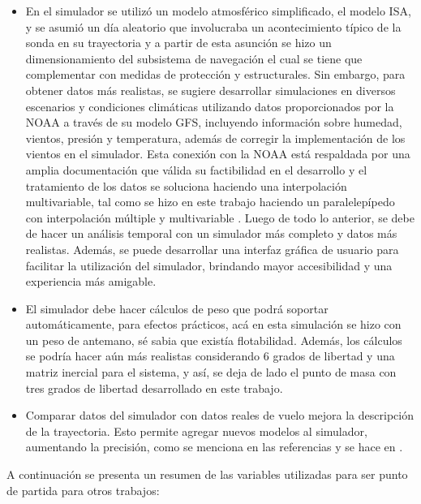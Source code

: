 \begin{itemize}
    \item En el simulador se utilizó un modelo atmosférico simplificado, el modelo ISA, y se asumió un día aleatorio que involucraba un acontecimiento típico de la sonda en su trayectoria y  a partir de esta asunción se hizo un dimensionamiento del subsistema de navegación el cual se tiene que complementar con medidas de protección y estructurales. Sin embargo, para obtener datos más realistas, se sugiere desarrollar simulaciones en diversos escenarios y condiciones climáticas utilizando datos proporcionados por la NOAA a través de su modelo GFS, incluyendo información sobre humedad, vientos,  presión y temperatura, además de corregir la implementación de los vientos en el simulador. Esta conexión con la NOAA está respaldada por una amplia documentación que válida su factibilidad en el desarrollo \cite{grid_python, consumo_datos_NOAA, info_acceso_NOAA, explicacion_consumo_datos_NOAA} y  el tratamiento de los datos se soluciona haciendo una interpolación multivariable, tal como se hizo en este trabajo haciendo un paralelepípedo con interpolación múltiple y multivariable \cite{spain_simulador}.  Luego de todo lo anterior,  se debe de hacer un análisis temporal con un simulador más completo y datos más realistas. Además, se puede desarrollar una interfaz gráfica de usuario para facilitar la utilización del simulador, brindando mayor accesibilidad y una experiencia más amigable.

    \item El simulador debe hacer cálculos de peso que podrá soportar automáticamente, para efectos prácticos, acá en esta simulación se hizo con un peso de antemano, sé sabia que existía flotabilidad. Además, los cálculos se podría hacer aún más realistas considerando 6 grados de libertad y una matriz inercial para el sistema,  y así, se deja de lado el punto de masa con tres grados de libertad desarrollado en este trabajo.

    \item Comparar datos del simulador con datos reales de vuelo mejora la descripción de la trayectoria. Esto permite agregar nuevos modelos al simulador, aumentando la precisión, como se menciona en las referencias y se hace en \cite{simulador_chino, parachute_6DOF, paracaidas_simplificado_futuro}. 

\end{itemize}

\newpage

A continuación se presenta un resumen de las variables utilizadas para ser punto de partida para otros trabajos:


